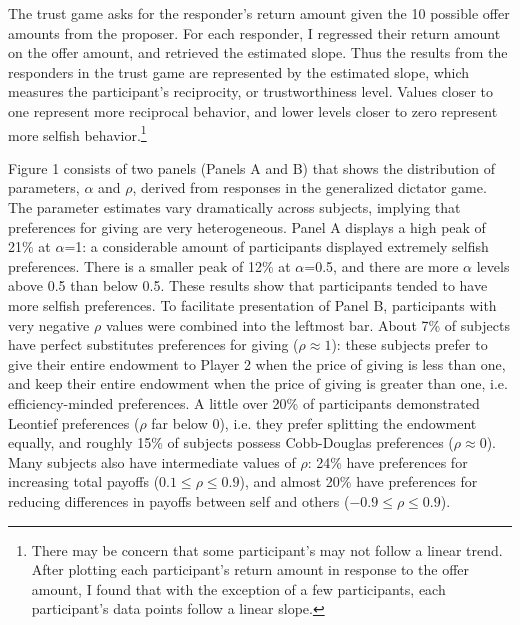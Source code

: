 \documentclass[12pt]{article}
\begin{document}
The trust game asks for the responder\rq s return amount given the 10 possible offer amounts from the proposer. For each responder, I regressed their return amount on the offer amount, and retrieved the estimated slope. Thus the results from the responders in the trust game are represented by the estimated slope, which measures the participant\rq s reciprocity, or trustworthiness level. Values closer to one represent more reciprocal behavior, and lower levels closer to zero represent more selfish behavior.\footnote{There may be concern that some participant\rq s may not follow a linear trend. After plotting each participant\rq s return amount in response to the offer amount, I found that with the exception of a few participants, each participant\rq s data points follow a linear slope.}

Figure 1 consists of two panels (Panels A and B) that shows the distribution of parameters, \(\alpha\) and \(\rho\), derived from responses in the generalized dictator game.  The parameter estimates vary dramatically across subjects, implying that preferences for giving are very heterogeneous. Panel A displays a high peak of 21\% at \(\alpha\)=1: a considerable amount of participants displayed extremely selfish preferences. There is a smaller peak of 12\% at \(\alpha\)=0.5, and there are more \(\alpha\) levels above 0.5 than below 0.5. These results show that participants tended to have more selfish preferences. To facilitate presentation of Panel B, participants with very negative \(\rho\) values were combined into the leftmost bar. About 7\% of subjects have perfect substitutes preferences for giving (\(\rho \approx 1\)): these subjects prefer to give their entire endowment to Player 2 when the price of giving is less than one, and keep their entire endowment when the price of giving is greater than one, i.e. efficiency-minded preferences. A little over 20\% of participants demonstrated Leontief preferences (\(\rho\) far below 0), i.e. they prefer splitting the endowment equally, and roughly 15\% of subjects possess Cobb-Douglas preferences (\(\rho \approx 0\)). Many subjects also have intermediate values of \(\rho\): 24\% have preferences for increasing total payoffs (\(0.1 \leq \rho \leq 0.9\)), and almost 20\% have preferences for reducing differences in payoffs between self and others (\(-0.9 \leq \rho \leq 0.9\)).
\end{document}
